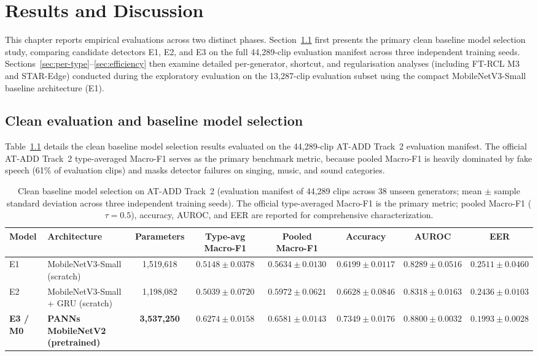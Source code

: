 \chapter{Results and Discussion}
\label{ch:results}

This chapter reports empirical evaluations across two distinct phases. Section~\ref{sec:clean-eval} first presents the primary clean baseline model selection study, comparing candidate detectors E1, E2, and E3 on the full 44{,}289-clip evaluation manifest across three independent training seeds. Sections~\ref{sec:per-type}--\ref{sec:efficiency} then examine detailed per-generator, shortcut, and regularisation analyses (including FT-RCL M3 and STAR-Edge) conducted during the exploratory evaluation on the 13{,}287-clip evaluation subset using the compact MobileNetV3-Small baseline architecture (E1).

\section{Clean evaluation and baseline model selection}
\label{sec:clean-eval}

Table~\ref{tab:overall} details the clean baseline model selection results evaluated on the 44{,}289-clip AT-ADD Track~2 evaluation manifest. The official AT-ADD Track~2 type-averaged Macro-F1 serves as the primary benchmark metric, because pooled Macro-F1 is heavily dominated by fake speech (61\% of evaluation clips) and masks detector failures on singing, music, and sound categories.

\begin{table}[htbp]
\centering
\caption{Clean baseline model selection on AT-ADD Track~2 (evaluation manifest of 44{,}289 clips across 38 unseen generators; mean $\pm$ sample standard deviation across three independent training seeds). The official type-averaged Macro-F1 is the primary metric; pooled Macro-F1 ($\tau=0.5$), accuracy, AUROC, and EER are reported for comprehensive characterization.}
\label{tab:overall}
\small
\setlength{\tabcolsep}{3.5pt}
\begin{adjustbox}{max width=\textwidth}
\begin{tabular}{@{}llcccccc@{}}
\toprule
Model & Architecture & Parameters & Type-avg Macro-F1 & Pooled Macro-F1 & Accuracy & AUROC & EER \\
\midrule
E1 & MobileNetV3-Small (scratch) & 1{,}519{,}618 & $0.5148 \pm 0.0378$ & $0.5634 \pm 0.0130$ & $0.6199 \pm 0.0117$ & $0.8289 \pm 0.0516$ & $0.2511 \pm 0.0460$ \\
E2 & MobileNetV3-Small + GRU (scratch) & 1{,}198{,}082 & $0.5039 \pm 0.0720$ & $0.5972 \pm 0.0621$ & $0.6628 \pm 0.0846$ & $0.8318 \pm 0.0163$ & $0.2436 \pm 0.0103$ \\
\textbf{E3 / M0} & \textbf{PANNs MobileNetV2 (pretrained)} & \textbf{3{,}537{,}250} & $\mathbf{0.6274 \pm 0.0158}$ & $\mathbf{0.6581 \pm 0.0143}$ & $\mathbf{0.7349 \pm 0.0176}$ & $\mathbf{0.8800 \pm 0.0032}$ & $\mathbf{0.1993 \pm 0.0028}$ \\
\bottomrule
\end{tabular}
\end{adjustbox}
\end{table}

